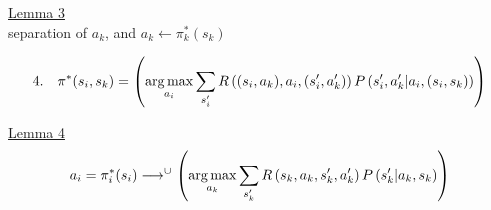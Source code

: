 \underline{Lemma 3}\\

\textasteriskcentered \quad separation of $a_k$, and $a_k \leftarrow \pi^{\ast}_k(s_k)$

 \begin{equation*}
4.\quad\pi^\ast(s_i, s_k) =\left( \operatorname*{arg\,max}_{a_i} \sum_{s^\prime_i}  R\left((s_i, a_k), a_i,(s^\prime_i, a^\prime_k) \right) P\left( s^\prime_i, a^\prime_k \middle| a_i,  (s_i, s_k) \right) \right)
\end{equation*}

\textasteriskcentered \quad \underline{Lemma 4}\\

\begin{equation*}
a_i = \pi^\ast_i(s_i) \longrightarrow^{\cup} \left( \operatorname*{arg\,max}_{a_k} \sum_{s^\prime_k}  R\left(s_k, a_k, s^\prime_k, a^\prime_k \right) P\left( s^\prime_k \middle| a_k, s_k \right) \right)
\end{equation*}

\begin{center}
\end{center}